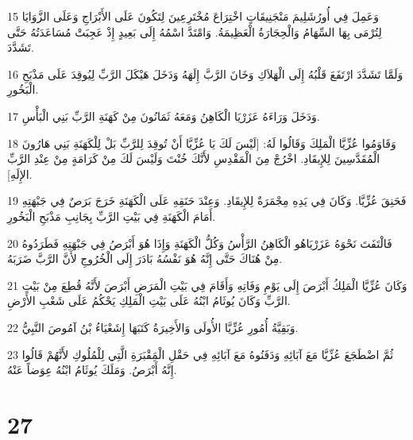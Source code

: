 \par 15 وَعَمِلَ فِي أُورُشَلِيمَ مَنْجَنِيقَاتٍ اخْتِرَاعَ مُخْتَرِعِينَ لِتَكُونَ عَلَى الأَبْرَاجِ وَعَلَى الزَّوَايَا لِتُرْمَى بِهَا السِّهَامُ وَالْحِجَارَةُ الْعَظِيمَةُ. وَامْتَدَّ اسْمُهُ إِلَى بَعِيدٍ إِذْ عَجِبَتْ مُسَاعَدَتُهُ حَتَّى تَشَدَّدَ.
\par 16 وَلَمَّا تَشَدَّدَ ارْتَفَعَ قَلْبُهُ إِلَى الْهَلاَكِ وَخَانَ الرَّبَّ إِلَهَهُ وَدَخَلَ هَيْكَلَ الرَّبِّ لِيُوقِدَ عَلَى مَذْبَحِ الْبَخُورِ.
\par 17 وَدَخَلَ وَرَاءَهُ عَزَرْيَا الْكَاهِنُ وَمَعَهُ ثَمَانُونَ مِنْ كَهَنَةِ الرَّبِّ بَنِي الْبَأْسِ.
\par 18 وَقَاوَمُوا عُزِّيَّا الْمَلِكَ وَقَالُوا لَهُ: [لَيْسَ لَكَ يَا عُزِّيَّا أَنْ تُوقِدَ لِلرَّبِّ بَلْ لِلْكَهَنَةِ بَنِي هَارُونَ الْمُقَدَّسِينَ لِلإِيقَادِ. اخْرُجْ مِنَ الْمَقْدِسِ لأَنَّكَ خُنْتَ وَلَيْسَ لَكَ مِنْ كَرَامَةٍ مِنْ عِنْدِ الرَّبِّ الإِلَهِ].
\par 19 فَحَنِقَ عُزِّيَّا. وَكَانَ فِي يَدِهِ مِجْمَرَةٌ لِلإِيقَادِ. وَعِنْدَ حَنَقِهِ عَلَى الْكَهَنَةِ خَرَجَ بَرَصٌ فِي جَبْهَتِهِ أَمَامَ الْكَهَنَةِ فِي بَيْتِ الرَّبِّ بِجَانِبِ مَذْبَحِ الْبَخُورِ.
\par 20 فَالْتَفَتَ نَحْوَهُ عَزَرْيَاهُو الْكَاهِنُ الرَّأْسُ وَكُلُّ الْكَهَنَةِ وَإِذَا هُوَ أَبْرَصُ فِي جَبْهَتِهِ فَطَرَدُوهُ مِنْ هُنَاكَ حَتَّى إِنَّهُ هُوَ نَفْسُهُ بَادَرَ إِلَى الْخُرُوجِ لأَنَّ الرَّبَّ ضَرَبَهُ.
\par 21 وَكَانَ عُزِّيَّا الْمَلِكُ أَبْرَصَ إِلَى يَوْمِ وَفَاتِهِ وَأَقَامَ فِي بَيْتِ الْمَرَضِ أَبْرَصَ لأَنَّهُ قُطِعَ مِنْ بَيْتِ الرَّبِّ وَكَانَ يُوثَامُ ابْنُهُ عَلَى بَيْتِ الْمَلِكِ يَحْكُمُ عَلَى شَعْبِ الأَرْضِ.
\par 22 وَبَقِيَّةُ أُمُورِ عُزِّيَّا الأُولَى وَالأَخِيرَةُ كَتَبَهَا إِشَعْيَاءُ بْنُ آمُوصَ النَّبِيُّ.
\par 23 ثُمَّ اضْطَجَعَ عُزِّيَّا مَعَ آبَائِهِ وَدَفَنُوهُ مَعَ آبَائِهِ فِي حَقْلِ الْمَِقْبَرَةِ الَّتِي لِلْمُلُوكِ لأَنَّهُمْ قَالُوا إِنَّهُ أَبْرَصُ. وَمَلَكَ يُوثَامُ ابْنُهُ عِوَضاً عَنْهُ.

\chapter{27}

